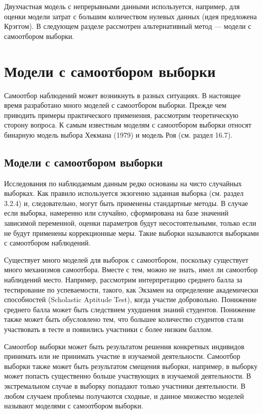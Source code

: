 Двухчастная модель с непрерывными данными используется, например, для оценки модели затрат с большим количеством нулевых данных (идея предложена Крэггом). В следующем разделе рассмотрен альтернативный метод --- модели с самоотбором выборки.


\section{Модели с самоотбором выборки}


Самоотбор наблюдений может возникнуть в разных ситуациях. В настоящее время разработано много моделей с самоотбором выборки. Прежде чем приводить примеры практического применения, рассмотрим теоретическую сторону вопроса. К самым известным моделям с самоотбором выборки относят бинарную модель выбора Хекмана (1979) и модель Роя (см. раздел 16.7).


\subsection{Модели с самоотбором выборки}


Исследования по наблюдаемым данным  редко основаны на чисто случайных выборках. Как правило используется экзогенно заданная выборка (см. раздел 3.2.4) и, следовательно, могут быть применены стандартные методы. В случае если выборка, намеренно или случайно, сформирована на базе  значений зависимой переменной, оценки параметров будут несостоятельными, только если не будут применены коррекционные меры. Такие выборки называются выборками с самоотбором наблюдений.


Существует много моделей для  выборок с самоотбором, поскольку существует много механизмов самоотбора. Вместе с тем, можно не знать, имел ли самоотбор наблюдений место. Например, рассмотрим интерпретацию среднего балла за тестирование по успеваемости, такого, как Экзамен на определение академически способностей (Scholastic Aptitude Test), когда участие добровольно. Понижение среднего балла может быть следствием ухудшения знаний студентов. Понижение также может быть обусловлено тем, что большее количество студентов стали участвовать в тесте и появились участники с более низким баллом.

Самоотбор выборки может быть результатом решения конкретных индивидов принимать или не принимать участие в изучаемой деятельности. Самоотбор выборки также может быть результатом смещения выборки, например, в выборку может попасть существенно больше участвующих в изучаемой деятельности. В экстремальном случае в выборку попадают только участники деятельности. В любом случаем проблемы получаются сходные, и данное множество моделей называют моделями с самоотбором выборки.


